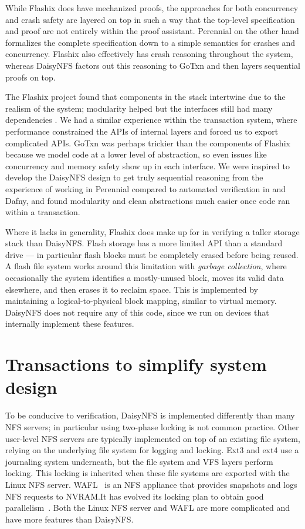While Flashix does have mechanized proofs, the approaches for both concurrency
and crash safety are layered on top in such a way that the top-level
specification and proof are not entirely within the proof assistant. Perennial
on the other hand formalizes the complete specification down to a simple
semantics for crashes and concurrency. Flashix also effectively has crash
reasoning throughout the system, whereas DaisyNFS factors out this reasoning to
GoTxn and then layers sequential proofs on top.

The Flashix project found that components in the stack intertwine due to the
realism of the system; modularity helped but the interfaces still had many
dependencies . We had a similar experience within the transaction system, where
performance constrained the APIs of internal layers and forced us to export
complicated APIs. GoTxn was perhaps trickier than the components of Flashix
because we model code at a lower level of abstraction, so even issues like
concurrency and memory safety show up in each interface. We were inspired to
develop the DaisyNFS design to get truly sequential reasoning from the
experience of working in Perennial compared to automated verification in \fstar
and Dafny, and found modularity and clean abstractions much easier once
code ran within a transaction.

Where it lacks in generality, Flashix does make up for in verifying a taller
storage stack than DaisyNFS. Flash storage has a more limited API than a
standard drive --- in particular flash blocks must be completely erased before
being reused. A flash file system works around this limitation with \emph{garbage
collection}, where occasionally the system identifies a mostly-unused block,
moves its valid data elsewhere, and then erases it to reclaim space. This is
implemented by maintaining a logical-to-physical block mapping, similar to
virtual memory. DaisyNFS does not require any of this code, since we run on
devices that internally implement these features.


\section{Transactions to simplify system design}
\label{sec:rel:txn}

To be conducive to verification, DaisyNFS is implemented differently than
many NFS servers; in particular using two-phase locking is not common
practice.  Other user-level NFS servers are typically implemented on
top of an existing file system, relying on the underlying file system
for logging and locking. Ext3 and ext4 use a journaling system underneath, but
the file system and VFS layers perform locking. This locking is inherited when
these file systems are exported with the Linux NFS server. WAFL~\cite{wafl:hitz}
is an NFS appliance that provides snapshots and logs NFS requests to
NVRAM.\@  It has evolved its locking plan to obtain good
parallelism~\cite{curtis:wafl}.  Both the Linux NFS server and WAFL
are more complicated and have more features than DaisyNFS.\@

